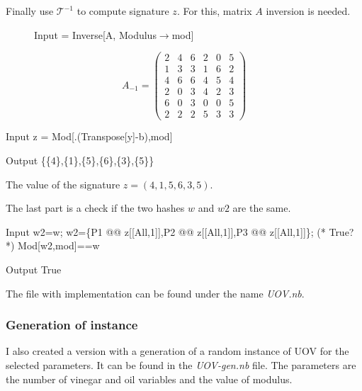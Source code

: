\documentclass[thesis=M,english]{FITthesis}[2019/12/23]
\begin{document}
\bigskip
\noindent
Finally use $\mathcal{T}^{-1}$ to compute signature $z$. For this, matrix $A$ inversion is needed.
\begin{figure}[h]
\begin{minipage}{0.59\textwidth}
\centering
\begin{mmaCell}[moredefined={A, mod}]{Input}
 = Inverse[A, Modulus\(\pmb{\to}\)mod]
\end{mmaCell}
\end{minipage}
\begin{minipage}{0.28\textwidth}
\centering
\begin{equation*}
A_{-1} =
\begin{pmatrix}
2 & 4 & 6 & 2 & 0 & 5 \\
1 & 3 & 3 & 1 & 6 & 2 \\
4 & 6 & 6 & 4 & 5 & 4 \\
2 & 0 & 3 & 4 & 2 & 3 \\
6 & 0 & 3 & 0 & 0 & 5 \\
2 & 2 & 2 & 5 & 3 & 3
\end{pmatrix}
\end{equation*}
\end{minipage}
\end{figure}
\begin{mmaCell}[moredefined={z, A, y, b, mod}]{Input}
z = Mod[.(Transpose[y]-b),mod]
\end{mmaCell}
\begin{mmaCell}{Output}
\{\{4\},\{1\},\{5\},\{6\},\{3\},\{5\}\}
\end{mmaCell}
The value of the signature $z = (4,1,5,6,3,5)$.

\bigskip
\noindent
The last part is a check if the two hashes $w$ and $w2$ are the same.
\begin{mmaCell}[moredefined={w2, w, P1, z, P2, P3, mod}]{Input}
w2=w;
w2=\{P1 @@ z[[All,1]],P2 @@ z[[All,1]],P3 @@ z[[All,1]]\};
(* True? *)
Mod[w2,mod]==w
\end{mmaCell}
\begin{mmaCell}[addtoindex=2]{Output}
True
\end{mmaCell}
The file with implementation can be found under the name \textit{UOV.nb}.

\subsubsection{Generation of instance}
I also created a version with a generation of a random instance of UOV for the selected parameters. It can be found in the \textit{UOV-gen.nb} file. The parameters are the number of vinegar and oil variables and the value of modulus.
\end{document}
